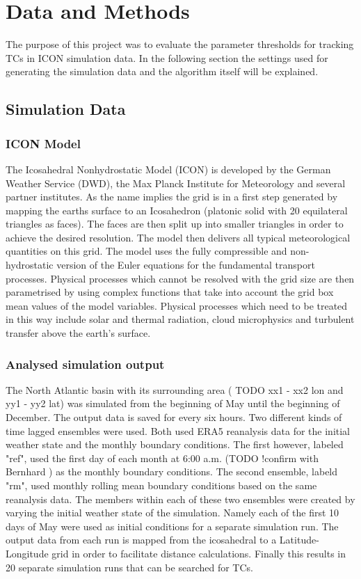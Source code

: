 \chapter{Data and Methods}\label{sec:methods}
The purpose of this project was to evaluate the parameter thresholds for tracking TCs in ICON simulation data. In the following section the settings used for generating the simulation data and the algorithm itself will be explained.
\section{Simulation Data}\label{sec:data}
\subsection*{ICON Model}
The Icosahedral Nonhydrostatic Model (ICON) is developed by the German Weather Service (DWD), the Max Planck Institute for Meteorology and several partner institutes. As the name implies the grid is in a first step generated by mapping the earths surface to an Icosahedron (platonic solid with 20 equilateral triangles as faces). The faces are then split up into smaller triangles in order to achieve the desired resolution. The model then delivers all typical meteorological quantities on this grid.
The model uses the fully compressible and non-hydrostatic version of the Euler equations for the fundamental transport processes. Physical processes which cannot be resolved with the grid size are then parametrised by using complex functions that take into account the grid box mean values of the model variables. Physical processes which need to be treated in this way include solar and thermal radiation, cloud microphysics and turbulent transfer above the earth's surface.\cite{dwd-icon}

\subsection*{Analysed simulation output}
The North Atlantic basin with its surrounding area ( TODO xx1 - xx2 lon and yy1 - yy2 lat) %
was simulated from the beginning of May until the beginning of December. The output data is saved for every six hours.
Two different kinds of time lagged ensembles were used. Both used ERA5 reanalysis data for the initial weather state and the monthly boundary conditions. The first however, labeled "ref", used the first day of each month at 6:00 a.m. (TODO !confirm with Bernhard ) %
as the monthly boundary conditions. The second ensemble, labeld "rm", used monthly rolling mean boundary conditions based on the same reanalysis data.
The members within each of these two ensembles were created by varying the initial weather state of the simulation. Namely each of the first 10 days of May were used as initial conditions for a separate simulation run. 
The output data from each run is mapped from the icosahedral to a Latitude-Longitude grid in order to facilitate distance calculations.
Finally this results in 20 separate simulation runs that can be searched for TCs.
